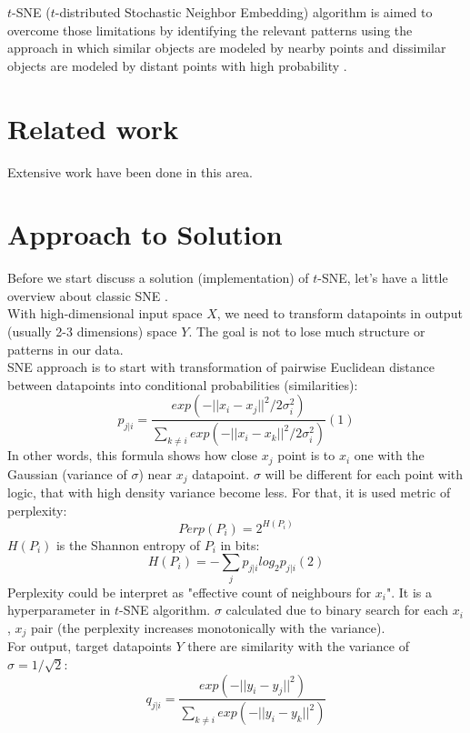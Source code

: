 $t$-SNE ($t$-distributed Stochastic Neighbor Embedding) algorithm is aimed to overcome those limitations by identifying the relevant patterns using the approach in which similar objects are modeled by nearby points and dissimilar objects are modeled by distant points with high probability \cite{tsnearticle}. 

\section{Related work}

Extensive work have been done in this area. 

\section{Approach to Solution}

Before we start discuss a solution (implementation) of $t$-SNE, let's have a little overview about classic SNE \cite{snearticle}.\\
With high-dimensional input space $X$, we need to transform datapoints in output (usually 2-3 dimensions) space $Y$. The goal is not to lose much structure or patterns in our data.\\
SNE approach is to start with transformation of pairwise Euclidean distance between datapoints into conditional probabilities (similarities):
$$ p_{j|i} = \frac{exp(-||x_i - x_j||^2 / 2 \sigma_i^2)}{\sum_{k \ne i}{exp(-||x_i - x_k||^2 / 2 \sigma_i^2)}} (1) $$
In other words, this formula shows how close $x_j$ point is to $x_i$ one with the Gaussian (variance of $\sigma$) near $x_j$ datapoint. $\sigma$ will be different for each point with logic, that with high density variance become less. For that, it is used metric of perplexity:
$$ Perp(P_i) = 2^{H(P_i)} $$
$H(P_i)$ is the Shannon entropy of $P_i$ in bits:
$$ H(P_i) = -\sum_j{}p_{j|i} log_2{p_{j|i}} (2) $$
Perplexity could be interpret as "effective count of neighbours for $x_i$". It is a hyperparameter in $t$-SNE algorithm. $\sigma$ calculated due to binary search for each $x_i$, $x_j$ pair (the perplexity increases monotonically with the variance).\\
For output, target datapoints $Y$ there are similarity with the variance of $\sigma = 1/\sqrt{2}$:
$$ q_{j|i} = \frac{exp(-||y_i - y_j||^2)}{\sum_{k \ne i}{exp(-||y_i - y_k||^2)}} $$

